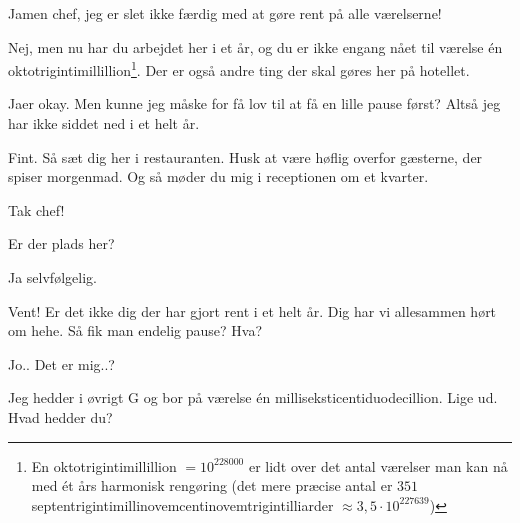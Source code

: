 \documentclass[a4paper,11pt]{article}
\begin{document}
\begin{sketch}

 Jamen chef, jeg er slet ikke færdig med at gøre rent på alle værelserne!

 Nej, men nu har du arbejdet her i et år, og du er ikke engang nået til værelse én oktotrigintimillillion\footnote{En oktotrigintimillillion $= 10^{228000}$ er lidt over det antal værelser man kan nå med ét års harmonisk rengøring (det mere præcise antal er $351$ septentrigintimillinovemcentinovemtrigintilliarder $\approx3,5\cdot10^{227639}$)}. Der er også andre ting der skal gøres her på hotellet.

 Jaer okay. Men kunne jeg måske for få lov til at få en lille pause først? Altså jeg har ikke siddet ned i et helt år.

  Fint. Så sæt dig her i restauranten. Husk at være høflig overfor gæsterne, der spiser morgenmad. Og så møder du mig i receptionen om et kvarter.

 Tak chef!


 Er der plads her?

 Ja selvfølgelig.


 Vent! Er det ikke dig der har gjort rent i et helt år. Dig har vi allesammen hørt om hehe. Så fik man endelig pause? Hva?

 Jo.. Det er mig..?

 Jeg hedder i øvrigt G og bor på værelse én milliseksticentiduodecillion. Lige ud. Hvad hedder du?


\end{sketch}
\end{document}
